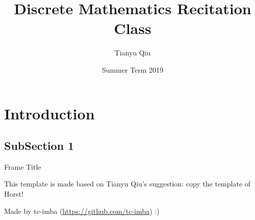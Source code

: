 \documentclass[aspectratio=169]{beamer}
\title[VE203]{Discrete Mathematics Recitation Class}
\author[Seven Fish]{Tianyu Qiu}
\institute[UMJI-SJTU]
{
	University of Michigan - Shanghai Jiaotong University
	\\\medskip
	Joint Institute
}
\date{Summer Term 2019}
\begin{document}
\maketitle

\section{Introduction}

\subsection{SubSection 1}

\begin{frame}{Frame Title}
    
This template is made based on Tianyu Qiu's suggestion: copy the template of Horst! \bigskip

Made by tc-imba (\url{https://github.com/tc-imba}) :)
    
\end{frame}
\end{document}
